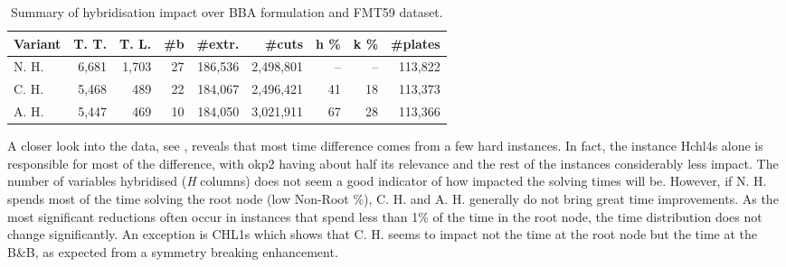 \documentclass[ppgc,tese,english,formais,babel]{iiufrgs}
\begin{document}
\begin{table}
\caption{Summary of hybridisation impact over BBA formulation and FMT59 dataset.}
\label{tab:g2kp_hyb_summary}
\begin{center}

\begin{tabular}{lrrrrrrrr}
\hline\hline
\textbf{Variant} & \textbf{T. T.} & \textbf{T. L.} & \textbf{\#b} & \textbf{\#extr.} & \textbf{\#cuts} & \textbf{h \%} & \textbf{k \%} & \textbf{\#plates} \\\hline
N. H. & 6,681 & 1,703 & 27 & 186,536 & 2,498,801 & -- & -- & 113,822 \\
C. H. & 5,468 & 489 & 22 & 184,067 & 2,496,421 & 41 & 18 & 113,373 \\
A. H. & 5,447 & 469 & 10 & 184,050 & 3,021,911 & 67 & 28 & 113,366 \\\hline\hline
\end{tabular}
\end{center}

\end{table}

A closer look into the data, see , reveals that most time difference comes from a few hard instances.
In fact, the instance Hchl4s alone is responsible for most of the difference, with okp2 having about half its relevance and the rest of the instances considerably less impact.
The number of variables hybridised (\emph{H} columns) does not seem a good indicator of how impacted the solving times will be.
However, if N. H. spends most of the time solving the root node (low Non-Root \%), C. H. and A. H. generally do not bring great time improvements.
As the most significant reductions often occur in instances that spend less than 1\% of the time in the root node, the time distribution does not change significantly.
An exception is CHL1s which shows that C. H. seems to impact not the time at the root node but the time at the B\&B, as expected from a symmetry breaking enhancement.
\end{document}
